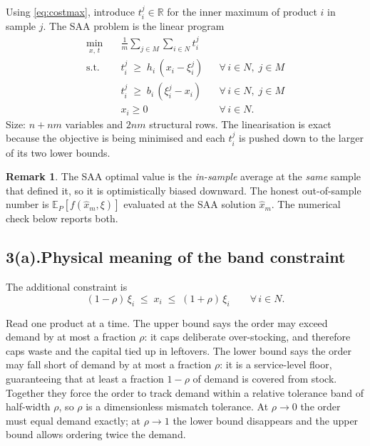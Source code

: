 \documentclass[11pt]{article}
\DeclareMathOperator*{\minimize}{min}
\theoremstyle{definition}
\newtheorem{remark}{Remark}
\begin{document}
Using \eqref{eq:costmax}, introduce $t^{j}_i \in \mathbb{R}$ for the inner
maximum of product $i$ in sample $j$. The SAA problem is the linear
program
\begin{align}
  \minimize_{x,\,t} \quad & \frac{1}{m} \sum_{j \in M} \sum_{i \in N}
    t^{j}_i \\
  \text{s.t.}\quad
    & t^{j}_i \;\ge\; h_i\,(x_i - \xi^{j}_i)
      && \forall\, i \in N,\; j \in M \\
    & t^{j}_i \;\ge\; b_i\,(\xi^{j}_i - x_i)
      && \forall\, i \in N,\; j \in M \\
    & x_i \ge 0 && \forall\, i \in N .
\end{align}
Size: $n + nm$ variables and $2nm$ structural rows. The linearisation is
exact because the objective is being minimised and each $t^{j}_i$ is
pushed down to the larger of its two lower bounds.

\begin{remark}
The SAA optimal value is the \emph{in-sample} average at the \emph{same}
sample that defined it, so it is optimistically biased downward. The
honest out-of-sample number is $\mathbb{E}_P[f(\hat{x}_m,\xi)]$ evaluated
at the SAA solution $\hat{x}_m$. The numerical check below reports both.
\end{remark}

\subsection*{3(a).\quad Physical meaning of the band constraint}

The additional constraint is
\begin{equation}
  (1-\rho)\,\xi_i \;\le\; x_i \;\le\; (1+\rho)\,\xi_i
  \qquad \forall\, i \in N .
  \label{eq:band}
\end{equation}

Read one product at a time. The upper bound says the order may exceed
demand by at most a fraction $\rho$: it caps deliberate over-stocking, and
therefore caps waste and the capital tied up in leftovers. The lower bound
says the order may fall short of demand by at most a fraction $\rho$: it
is a service-level floor, guaranteeing that at least a fraction $1-\rho$
of demand is covered from stock. Together they force the order to track
demand within a relative tolerance band of half-width $\rho$, so $\rho$ is
a dimensionless mismatch tolerance. At $\rho \to 0$ the order must equal
demand exactly; at $\rho \to 1$ the lower bound disappears and the upper
bound allows ordering twice the demand.
\end{document}
